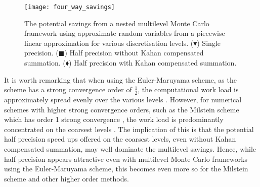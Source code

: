 \documentclass[manuscript,review]{acmart}
\begin{document}
\begin{figure}[htb]
\centering
\texttt{[image: four\_way\_savings]}

\caption{The potential savings from a nested multilevel Monte Carlo framework using approximate random variables from a piecewise linear approximation for various discretisation levels. ({\large $ \blacktriangledown $}) Single precision. ($ \blacksquare $) Half precision without Kahan compensated summation. ($ \blacklozenge $) Half precision with Kahan compensated summation.}
\label{fig:four_way_savings}

\end{figure}

It is worth remarking that when using the Euler-Maruyama scheme, as the scheme has a strong convergence order of $ \tfrac{1}{2} $, the computational work load is approximately spread evenly over the various levels \citep{giles2008multilevel}. However, for numerical schemes with higher strong convergence orders, such as the Milstein scheme which has order 1 strong convergence \citep{kloeden1999numerical,glasserman2013monte}, the work load is predominantly concentrated on the coarsest levels \citep{giles2008multilevel}. The implication of this is that the potential half precision speed ups offered on the coarsest levels, even without Kahan compensated summation, may well dominate the multilevel savings. Hence, while half precision appears attractive even with multilevel Monte Carlo frameworks using the Euler-Maruyama scheme, this becomes even more so for the Milstein scheme and other higher order methods. 
\end{document}
